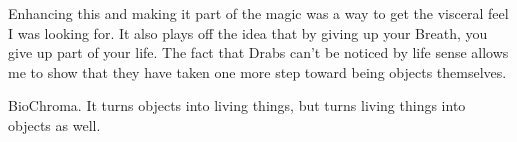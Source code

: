 Enhancing this and making it part of the magic was a way to get the visceral feel I was looking for. It also plays off the idea that by giving up your Breath, you give up part of your life. The fact that Drabs can’t be noticed by life sense allows me to show that they have taken one more step toward being objects themselves.

BioChroma. It turns objects into living things, but turns living things into objects as well.



